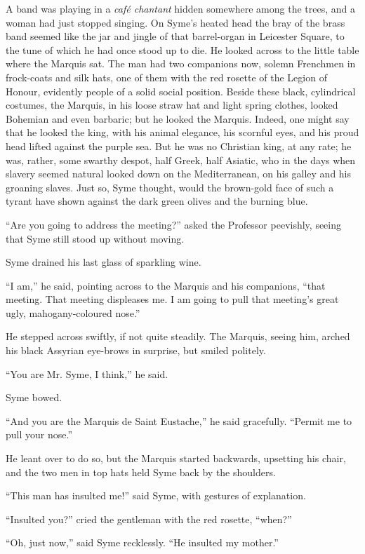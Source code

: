 \documentclass{book}
\begin{document}
A band was playing in a \emph{café chantant} hidden somewhere among the trees, and a woman had just stopped singing. On Syme’s heated head the bray of the brass band seemed like the jar and jingle of that barrel-organ in Leicester Square, to the tune of which he had once stood up to die. He looked across to the little table where the Marquis sat. The man had two companions now, solemn Frenchmen in frock-coats and silk hats, one of them with the red rosette of the Legion of Honour, evidently people of a solid social position. Beside these black, cylindrical costumes, the Marquis, in his loose straw hat and light spring clothes, looked Bohemian and even barbaric; but he looked the Marquis. Indeed, one might say that he looked the king, with his animal elegance, his scornful eyes, and his proud head lifted against the purple sea. But he was no Christian king, at any rate; he was, rather, some swarthy despot, half Greek, half Asiatic, who in the days when slavery seemed natural looked down on the Mediterranean, on his galley and his groaning slaves. Just so, Syme thought, would the brown-gold face of such a tyrant have shown against the dark green olives and the burning blue.

“Are you going to address the meeting?” asked the Professor peevishly, seeing that Syme still stood up without moving.

Syme drained his last glass of sparkling wine.

“I am,” he said, pointing across to the Marquis and his companions, “that meeting. That meeting displeases me. I am going to pull that meeting’s great ugly, mahogany-coloured nose.”

He stepped across swiftly, if not quite steadily. The Marquis, seeing him, arched his black Assyrian eye-brows in surprise, but smiled politely.

“You are Mr. Syme, I think,” he said.

Syme bowed.

“And you are the Marquis de Saint Eustache,” he said gracefully. “Permit me to pull your nose.”

He leant over to do so, but the Marquis started backwards, upsetting his chair, and the two men in top hats held Syme back by the shoulders.

“This man has insulted me!” said Syme, with gestures of explanation.

“Insulted you?” cried the gentleman with the red rosette, “when?”

“Oh, just now,” said Syme recklessly. “He insulted my mother.”
\end{document}

